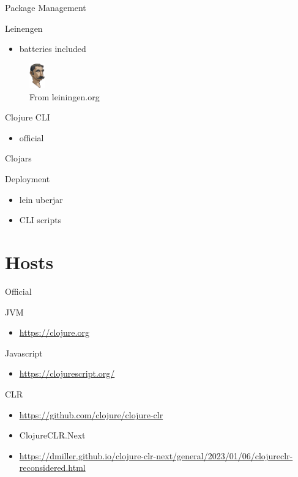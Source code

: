 \documentclass[bigger]{beamer}
\begin{document}
\begin{frame}[label={sec:org375059b}]{Package Management}
\begin{block}{Leinengen}
\begin{itemize}
\item batteries included
\end{itemize}
\begin{figure}[htbp]
\centering
\includegraphics[width=25px]{../../resources/leiningen.jpg}
\caption{\label{leiningen}From leiningen.org}
\end{figure}
\end{block}

\begin{block}{Clojure CLI}
\begin{itemize}
\item official
\end{itemize}
\end{block}
\begin{block}{Clojars}
\end{block}
\end{frame}

\begin{frame}[label={sec:org2db6457}]{Deployment}
\begin{itemize}
\item lein uberjar
\item CLI scripts
\end{itemize}
\end{frame}

\section{Hosts}
\label{sec:org8564d7c}

\begin{frame}[label={sec:org08dc3a8}]{Official}
\begin{block}{JVM}
\begin{itemize}
\item \url{https://clojure.org}
\end{itemize}
\end{block}

\begin{block}{Javascript}
\begin{itemize}
\item \url{https://clojurescript.org/}
\end{itemize}
\end{block}

\begin{block}{CLR}
\begin{itemize}
\item \url{https://github.com/clojure/clojure-clr}
\item ClojureCLR.Next
\item \url{https://dmiller.github.io/clojure-clr-next/general/2023/01/06/clojureclr-reconsidered.html}
\end{itemize}
\end{block}
\end{frame}
\end{document}
